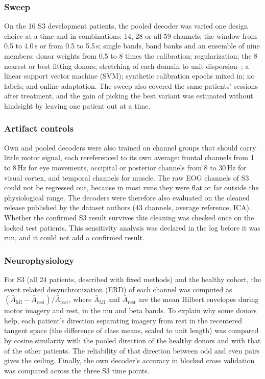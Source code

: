 \documentclass{ieeeaccess}
\begin{document}
\subsubsection{Sweep} On the 16 S3 development patients, the pooled decoder was varied one design choice at a time and in combinations: 14, 28 or all 59 channels; the window from 0.5 to 4.0\,s or from 0.5 to 5.5\,s; single bands, band banks and an ensemble of nine members; donor weights from 0.5 to 8 times the calibration; regularization; the 8 nearest or best fitting donors; stretching of each domain to unit dispersion~\cite{rodrigues2019}; a linear support vector machine (SVM); synthetic calibration epochs mixed in; no labels; and online adaptation. The sweep also covered the same patients' sessions after treatment, and the gain of picking the best variant was estimated without hindsight by leaving one patient out at a time.

\subsubsection{Artifact controls} Own and pooled decoders were also trained on channel groups that should carry little motor signal, each rereferenced to its own average: frontal channels from 1 to 8\,Hz for eye movements, occipital or posterior channels from 8 to 30\,Hz for visual cortex, and temporal channels for muscle. The raw EOG channels of S3 could not be regressed out, because in most runs they were flat or far outside the physiological range. The decoders were therefore also evaluated on the cleaned release published by the dataset authors (43 channels, average reference, ICA). Whether the confirmed S3 result survives this cleaning was checked once on the locked test patients. This sensitivity analysis was declared in the log before it was run, and it could not add a confirmed result.

\subsubsection{Neurophysiology} For S3 (all 24 patients, described with fixed methods) and the healthy cohort, the event related desynchronization (ERD) of each channel was computed as $(\bar A_{\mathrm{MI}} - \bar A_{\mathrm{rest}}) / \bar A_{\mathrm{rest}}$, where $\bar A_{\mathrm{MI}}$ and $\bar A_{\mathrm{rest}}$ are the mean Hilbert envelopes during motor imagery and rest, in the mu and beta bands. To explain why some donors help, each patient's direction separating imagery from rest in the recentered tangent space (the difference of class means, scaled to unit length) was compared by cosine similarity with the pooled direction of the healthy donors and with that of the other patients. The reliability of that direction between odd and even pairs gives the ceiling. Finally, the own decoder's accuracy in blocked cross validation was compared across the three S3 time points.
\end{document}
